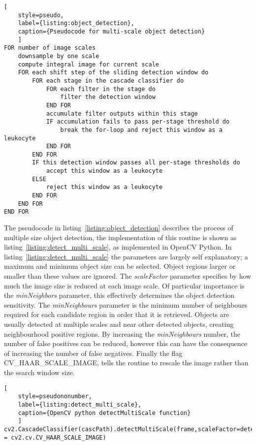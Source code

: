 \begin{lstlisting}[
	style=pseudo,
	label={listing:object_detection},
	caption={Pseudocode for multi-scale object detection}
	]
FOR number of image scales
	downsample by one scale
	compute integral image for current scale
	FOR each shift step of the sliding detection window do
		FOR each stage in the cascade classifier do
			FOR each filter in the stage do
				filter the detection window
			END FOR
			accumulate filter outputs within this stage
			IF accumulation fails to pass per-stage threshold do
				break the for-loop and reject this window as a leukocyte
			END FOR
		END FOR
		IF this detection window passes all per-stage thresholds do
			accept this window as a leukocyte
		ELSE
			reject this window as a leukocyte
		END FOR
	END FOR
END FOR
\end{lstlisting}
The pseudocode in listing~\ref{listing:object_detection} describes the process of multiple size object detection, the implementation of this routine is shown as listing~\ref{listing:detect_multi_scale}, as implemented in OpenCV Python. In listing~\ref{listing:detect_multi_scale} the parameters are largely self explanatory; a maximum and minimum object size can be selected. Object regions larger or smaller than these values are ignored. The \emph{scaleFactor} parameter specifies by how much the image size is reduced at each image scale. Of particular importance is the \emph{minNeighbors} parameter, this effectively determines the object detection sensitivity. The \emph{minNeighbours} parameter is the minimum number of neighbours required for each candidate region in order that it is retrieved. Objects are usually detected at multiple scales and near other detected objects, creating neighbourhood positive regions. By increasing the \emph{minNeighbours} number, the number of false positives can be reduced, however this can have the consequence of increasing the number of false negatives. Finally the flag CV\_HAAR\_SCALE\_IMAGE, tells the routine to rescale the image rather than the search window size.

\begin{lstlisting}[
	style=pseudononumber,
	label={listing:detect_multi_scale},
	caption={OpenCV python detectMultiScale function}
	]
cv2.CascadeClassifier(cascPath).detectMultiScale(frame,scaleFactor=detectParticlesScaleFactor,minNeighbors=detectParticlesMinNeighbors,minSize=detectParticlesMinSize,maxSize=detectParticlesMaxSize,flags = cv2.cv.CV_HAAR_SCALE_IMAGE)
\end{lstlisting}


